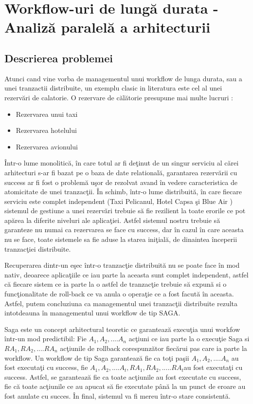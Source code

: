 \documentclass[a4paper,12pt]{report}
\begin{document}
\chapter{Workflow-uri de lungă durata - Analiză paralelă a arhitecturii}
\section{Descrierea problemei}
\quad Atunci cand vine vorba de managementul unui workflow de lunga durata, sau a unei tranzactii distribuite, un exemplu clasic in literatura este cel al unei rezervări de calatorie. O rezervare de călătorie presupune mai multe lucruri : 
\begin{itemize}
\item Rezervarea unui taxi
\item Rezervarea hotelului
\item Rezervarea avionului
\end{itemize}
\par Într-o lume monolitică, în care totul ar fi deţinut de un singur serviciu al cărei arhitecturi s-ar fi bazat pe o baza de date relatională, garantarea rezervării cu success ar fi fost o problemă uşor de rezolvat avand în vedere caracteristica de atomicitate de unei tranzacţii. În schimb, într-o lume distribuită, în care fiecare serviciu este complet independent (Taxi Pelicanul, Hotel Capsa şi Blue Air ) sistemul de gestiune a unei rezervări trebuie să fie rezilient la toate erorile ce pot apărea la diferite niveluri ale aplicaţiei. Astfel sistemul nostru trebuie să garanteze nu numai ca rezervarea se face cu success, dar în cazul în care aceasta nu se face, toate sistemele sa fie aduse la starea iniţială, de dinaintea începerii tranzacţiei distribuite.
\par Recuperarea dintr-un eşec într-o tranzacţie distribuită nu se poate face în mod nativ, deoarece aplicaţiile ce iau parte la aceasta sunt complet independent, astfel că fiecare sistem ce ia parte la o astfel de tranzacţie trebuie să expună si o funcţionalitate de roll-back ce va anula o operaţie ce a fost facută în aceasta. Astfel, putem concluziuna ca managementul unei tranzacţii distribuite rezulta intotdeauna în managementul unui workflow de tip SAGA. 
\par Saga este un concept arhitectural teoretic ce garantează execuţia unui workfow într-un mod predictibil: Fie \(A_{1}, A_{2}, .... A_{n}\) acţiuni ce iau parte la o execuţie Saga si \(RA_{1}, RA_{2}, .... RA_{n}\) acţiunile de rollback corespunzător fiecărui pas care ia parte la workflow. Un workflow de tip Saga garantează fie ca toţi paşii \(A_{1}, A_{2}, .... A_{n}\) au fost executaţi cu success, fie \(A_{1}, A_{2}, .... A_{t} , RA_{1}, RA_{2}, ..... RA_{t}\)au fost executaţi cu success. Astfel, se garantează fie ca toate acţiunile au fost executate cu success, fie că toate acţiunile ce au apucat să fie executate până la un punct de eroare au fost anulate cu succes. În final, sistemul va fi mereu într-o stare consistentă. 
\end{document}
